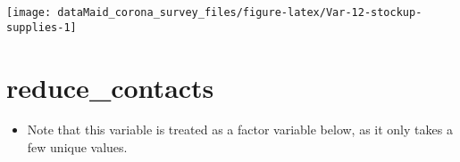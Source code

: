 \documentclass[
]{report}
\providecommand{\tightlist}{%
  \setlength{\itemsep}{0pt}\setlength{\parskip}{0pt}}
\begin{document}
\begin{minipage}{0.25 \textwidth}

\begin{center}\texttt{[image: dataMaid\_corona\_survey\_files/figure-latex/Var-12-stockup-supplies-1]} \end{center}

\end{minipage}

\noindent\makebox[\linewidth]{\rule{\textwidth}{0.4pt}}

\hypertarget{reduce_contacts}{%
\section{reduce\_contacts}\label{reduce_contacts}}

\begin{itemize}
\tightlist
\item
  Note that this variable is treated as a factor variable below, as it
  only takes a few unique values.
\end{itemize}
\end{document}
